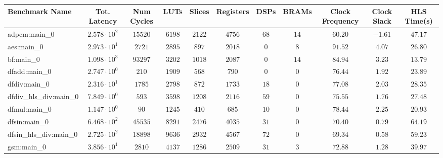 \begin{tabular}{|l|c|c|c|c|c|c|c|c|c|c|}
\hline
Benchmark Name          & Tot. Latency           & Num Cycles & LUTs      & Slices    & Registers & DSPs    & BRAMs   & Clock Frequency & Clock Slack & HLS Time(s) \\
\hline
adpcm:main\_0           & $ 2.578 \cdot 10^{2} $ & $ 15520  $ & $ 6198  $ & $ 2122  $ & $ 4756  $ & $ 68  $ & $ 14  $ & $ 60.20       $ & $ -1.61   $ & $ 47.17   $ \\
aes:main\_0             & $ 2.973 \cdot 10^{1} $ & $ 2721   $ & $ 2895  $ & $ 897   $ & $ 2018  $ & $ 0   $ & $ 8   $ & $ 91.52       $ & $ 4.07    $ & $ 26.80   $ \\
bf:main\_0              & $ 1.098 \cdot 10^{3} $ & $ 93297  $ & $ 3202  $ & $ 1018  $ & $ 2087  $ & $ 0   $ & $ 14  $ & $ 84.94       $ & $ 3.23    $ & $ 13.79   $ \\
dfadd:main\_0           & $ 2.747 \cdot 10^{0} $ & $ 210    $ & $ 1909  $ & $ 568   $ & $ 790   $ & $ 0   $ & $ 0   $ & $ 76.44       $ & $ 1.92    $ & $ 23.89   $ \\
dfdiv:main\_0           & $ 2.316 \cdot 10^{1} $ & $ 1785   $ & $ 2798  $ & $ 872   $ & $ 1733  $ & $ 18  $ & $ 0   $ & $ 77.08       $ & $ 2.03    $ & $ 28.35   $ \\
dfdiv\_hls\_div:main\_0 & $ 7.849 \cdot 10^{0} $ & $ 593    $ & $ 3598  $ & $ 1208  $ & $ 2116  $ & $ 59  $ & $ 0   $ & $ 75.55       $ & $ 1.76    $ & $ 27.48   $ \\
dfmul:main\_0           & $ 1.147 \cdot 10^{0} $ & $ 90     $ & $ 1245  $ & $ 410   $ & $ 685   $ & $ 10  $ & $ 0   $ & $ 78.44       $ & $ 2.25    $ & $ 20.93   $ \\
dfsin:main\_0           & $ 6.468 \cdot 10^{2} $ & $ 45535  $ & $ 8291  $ & $ 2476  $ & $ 4035  $ & $ 31  $ & $ 0   $ & $ 70.40       $ & $ 0.79    $ & $ 64.19   $ \\
dfsin\_hls\_div:main\_0 & $ 2.725 \cdot 10^{2} $ & $ 18898  $ & $ 9636  $ & $ 2932  $ & $ 4567  $ & $ 72  $ & $ 0   $ & $ 69.34       $ & $ 0.58    $ & $ 59.23   $ \\
gsm:main\_0             & $ 3.856 \cdot 10^{1} $ & $ 2810   $ & $ 4137  $ & $ 1286  $ & $ 2509  $ & $ 31  $ & $ 3   $ & $ 72.88       $ & $ 1.28    $ & $ 39.97   $ \\

\end{tabular}
